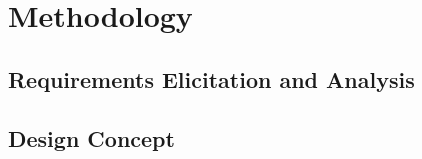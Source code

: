 \newpage
\chapter{Methodology}

\section{Requirements Elicitation and Analysis}
\section{Design Concept}
